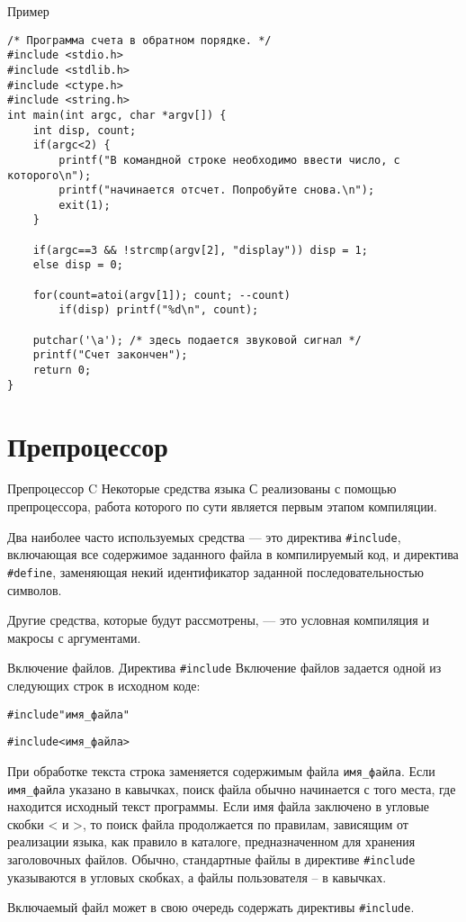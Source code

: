 \documentclass{beamer}
\begin{document}
\begin{frame}[fragile]{Пример}
\begin{verbatim}
/* Программа счета в обратном порядке. */
#include <stdio.h>
#include <stdlib.h>
#include <ctype.h>
#include <string.h>
int main(int argc, char *argv[]) {
    int disp, count;
    if(argc<2) {
        printf("В командной строке необходимо ввести число, с которого\n");
        printf("начинается отсчет. Попробуйте снова.\n");
        exit(1);
    }
    
    if(argc==3 && !strcmp(argv[2], "display")) disp = 1;
    else disp = 0;
    
    for(count=atoi(argv[1]); count; --count)
        if(disp) printf("%d\n", count);
    
    putchar('\a'); /* здесь подается звуковой сигнал */
    printf("Счет закончен");
    return 0;
}
\end{verbatim}
\end{frame}

\section{Препроцессор}

\begin{frame}{Препроцессор C}
    Некоторые средства языка С реализованы с помощью препроцессора, работа которого по сути является первым этапом компиляции.
    
    Два наиболее часто используемых средства — это директива \texttt{\#include}, включающая все содержимое заданного файла в компилируемый код, и директива \texttt{\#define}, заменяющая некий идентификатор заданной последовательностью символов. 

    Другие средства, которые будут рассмотрены, — это условная компиляция и макросы с аргументами.
\end{frame}


\begin{frame}{Включение файлов. Директива \texttt{\#include}}
    Включение файлов задается одной из следующих строк в исходном коде:
    
    \begin{alltt}
    \#include "имя\_файла"
    
    \#include <имя\_файла>
    \end{alltt}
    
    При обработке текста строка заменяется содержимым файла \texttt{имя\_файла}. Если \texttt{имя\_файла} указано в кавычках, поиск файла обычно начинается с того места, где находится исходный текст программы.
    Если имя файла заключено в угловые скобки < и >, то поиск файла продолжается по правилам, зависящим от реализации языка, как правило в каталоге, предназначенном для хранения заголовочных файлов.
    Обычно, стандартные файлы в директиве \texttt{\#include} указываются в угловых скобках, а файлы пользователя – в кавычках.
    
    Включаемый файл может в свою очередь содержать директивы \texttt{\#include}.
\end{frame}
\end{document}
